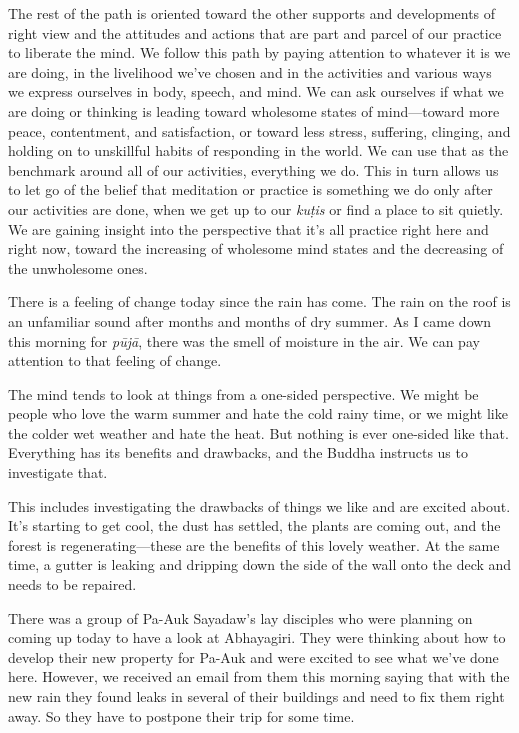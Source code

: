 The rest of the path is oriented toward the other supports and 
developments of right view and the attitudes and actions that are part 
and parcel of our practice to liberate the mind. We follow this path by 
paying attention to whatever it is we are doing, in the livelihood 
we've chosen and in the activities and various ways we express 
ourselves in body, speech, and mind. We can ask ourselves if what we 
are doing or thinking is leading toward wholesome states of 
mind---toward more peace, contentment, and satisfaction, or toward less 
stress, suffering, clinging, and holding on to unskillful habits of 
responding in the world. We can use that as the benchmark around all of 
our activities, everything we do. This in turn allows us to let go of 
the belief that meditation or practice is something we do only after 
our activities are done, when we get up to our \emph{kuṭis} or find a 
place to sit quietly. We are gaining insight into the perspective that 
it's all practice right here and right now, toward the increasing of 
wholesome mind states and the decreasing of the unwholesome ones.


There is a feeling of change today since the rain has come. The rain on 
the roof is an unfamiliar sound after months and months of dry summer. 
As I came down this morning for \emph{pūjā}, there was the smell of 
moisture in the air. We can pay attention to that feeling of change.

The mind tends to look at things from a one-sided perspective. We might 
be people who love the warm summer and hate the cold rainy time, or we 
might like the colder wet weather and hate the heat. But nothing is 
ever one-sided like that. Everything has its benefits and drawbacks, 
and the Buddha instructs us to investigate that.

This includes investigating the drawbacks of things we like and are 
excited about. It's starting to get cool, the dust has settled, the 
plants are coming out, and the forest is regenerating---these are the 
benefits of this lovely weather. At the same time, a gutter is leaking 
and dripping down the side of the wall onto the deck and needs to be 
repaired.

There was a group of Pa-Auk Sayadaw's lay disciples who were planning 
on coming up today to have a look at Abhayagiri. They were thinking 
about how to develop their new property for Pa-Auk and were excited to 
see what we've done here. However, we received an email from them this 
morning saying that with the new rain they found leaks in several of 
their buildings and need to fix them right away. So they have to 
postpone their trip for some time.

